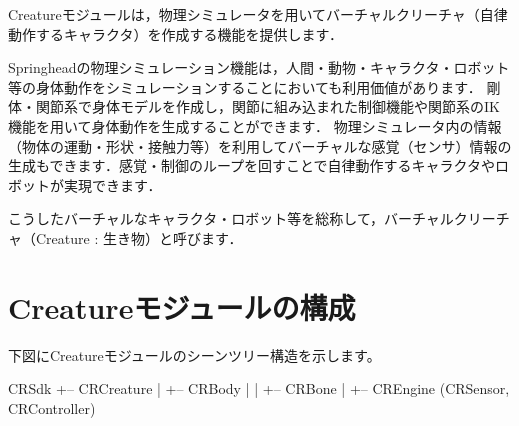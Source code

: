 \begin{chapterabstract}
Creatureモジュールは，物理シミュレータを用いてバーチャルクリーチャ（自律動作するキャラクタ）を作成する機能を提供します．

Springheadの物理シミュレーション機能は，人間・動物・キャラクタ・ロボット等の身体動作をシミュレーションすることにおいても利用価値があります．
\KLUDGE 剛体・関節系で身体モデルを作成し，関節に組み込まれた制御機能や関節系のIK機能を用いて身体動作を生成することができます．
\KLUDGE 物理シミュレータ内の情報（物体の運動・形状・接触力等）を利用してバーチャルな感覚（センサ）情報の生成もできます．感覚・制御のループを回すことで自律動作するキャラクタやロボットが実現できます．

\KLUDGE こうしたバーチャルなキャラクタ・ロボット等を総称して，バーチャルクリーチャ（Creature : 生き物）と呼びます．
\end{chapterabstract}

\KLUDGE %
\KLUDGE %
\KLUDGE %

\KLUDGE %
\KLUDGE %
\KLUDGE %

\KLUDGE %

\KLUDGE %
\KLUDGE %
\KLUDGE %

\KLUDGE %
\KLUDGE %


\KLUDGE %
\KLUDGE %
\KLUDGE %
\KLUDGE %

\section{Creatureモジュールの構成}

\KLUDGE 下図にCreatureモジュールのシーンツリー構造を示します。

\begin{sourcecode}
CRSdk
\KLUDGE +-- CRCreature
\KLUDGE |   +-- CRBody
\KLUDGE |   |   +-- CRBone
\KLUDGE |   +-- CREngine (CRSensor, CRController)
\end{sourcecode}

